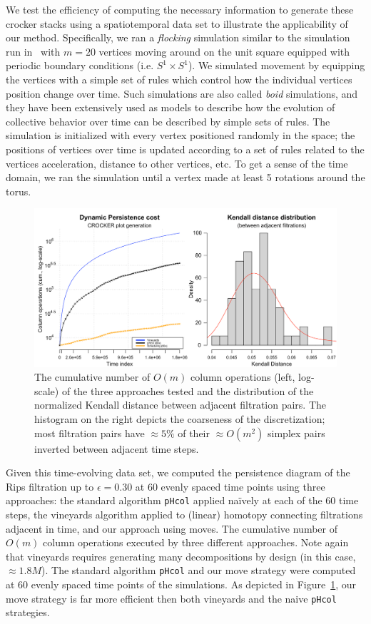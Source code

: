 \documentclass{article} %
\begin{document}
We test the efficiency of computing the necessary information to generate these crocker stacks using a spatiotemporal data set to illustrate the applicability of our method. Specifically, we ran a \emph{flocking} simulation similar to the simulation run in~\cite{topaz2015topological} with $m = 20$ vertices moving around on the unit square equipped with periodic boundary conditions (i.e. $S^1 \times S^1$). We simulated movement by equipping the vertices with a simple set of rules which control how the individual vertices position change over time. Such simulations are also called \emph{boid} simulations, and they have been extensively used as models to describe how the evolution of collective behavior over time can be described by simple sets of rules.
The simulation is initialized with every vertex positioned randomly in the space; the positions of vertices over time is updated according to a set of rules related to the vertices acceleration, distance to other vertices, etc. To get a sense of the time domain, we ran the simulation until a vertex made at least 5 rotations around the torus. 
\begin{figure}[ht]
	\centering
	\includegraphics[width=\textwidth]{boid_sim_results.png}
	\caption{ The cumulative number of $O(m)$ column operations (left, log-scale) of the three approaches tested and the distribution of the normalized Kendall distance between adjacent filtration pairs. The histogram on the right depicts the coarseness of the discretization; most filtration pairs have $\approx 5\%$ of their $\approx O(m^2)$ simplex pairs inverted between adjacent time steps.}\label{fig:boid_sim_results}
\end{figure}

Given this time-evolving data set, we computed the persistence diagram of the Rips filtration up to $\epsilon = 0.30$ at 60 evenly spaced time points using three approaches: the standard algorithm \texttt{pHcol} applied naïvely at each of the 60 time steps, the vineyards algorithm applied to (linear) homotopy connecting filtrations adjacent in time, and our approach using moves.   
The cumulative number of $O(m)$ column operations executed by three different approaches. Note again that vineyards requires generating many decompositions by design (in this case, $\approx 1.8M$). The standard algorithm \texttt{pHcol} and our move strategy were computed at 60 evenly spaced time points of the simulations. As depicted in Figure~\ref{fig:boid_sim_results}, our move strategy is far more efficient then both vineyards and the naive \texttt{pHcol} strategies. 
\end{document}
